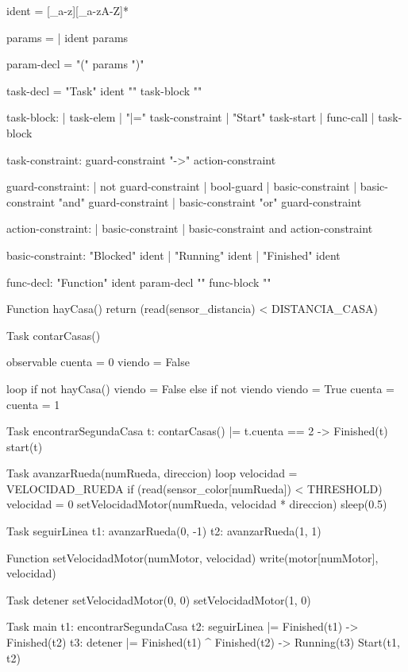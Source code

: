 
ident = [_a-z][_a-zA-Z]*

params =
       | ident params

param-decl = "(" params ")"

task-decl = "Task" ident "{" task-block "}"

task-block:
           | task-elem
           | "|=" task-constraint
           | "Start" task-start
           | func-call
           | task-block

task-constraint: guard-constraint "->" action-constraint

guard-constraint:
                  | not guard-constraint
                  | bool-guard
                  | basic-constraint
                  | basic-constraint "and" guard-constraint
                  | basic-constraint "or" guard-constraint

action-constraint:
                  | basic-constraint
                  | basic-constraint and action-constraint

basic-constraint: "Blocked" ident
                | "Running" ident
                | "Finished" ident


func-decl: "Function" ident param-decl "{" func-block "}"

Function hayCasa() {
  return (read(sensor_distancia) < DISTANCIA_CASA)
}

Task contarCasas() {
  observable cuenta = 0
  viendo = False

  loop {
    if not hayCasa() {
       viendo = False
    } else if not viendo {
       viendo = True
       cuenta = cuenta = 1
    }
  }
}

Task encontrarSegundaCasa {
  t: contarCasas()
  |= t.cuenta == 2 -> Finished(t)
  start(t)
}

Task avanzarRueda(numRueda, direccion) {
  loop {
    velocidad = VELOCIDAD_RUEDA
    if (read(sensor_color[numRueda]) < THRESHOLD) {
      velocidad = 0
    }
    setVelocidadMotor(numRueda, velocidad * direccion)
    sleep(0.5)
  }
}

Task seguirLinea {
  t1: avanzarRueda(0, -1)
  t2: avanzarRueda(1, 1)
}

Function setVelocidadMotor(numMotor, velocidad) {
  write(motor[numMotor], velocidad)
}

Task detener {
  setVelocidadMotor(0, 0)
  setVelocidadMotor(1, 0)
}

Task main {
  t1: encontrarSegundaCasa
  t2: seguirLinea
  |= Finished(t1) -> Finished(t2)
  t3: detener
  |= Finished(t1) ^ Finished(t2) -> Running(t3)
  Start(t1, t2)
}

